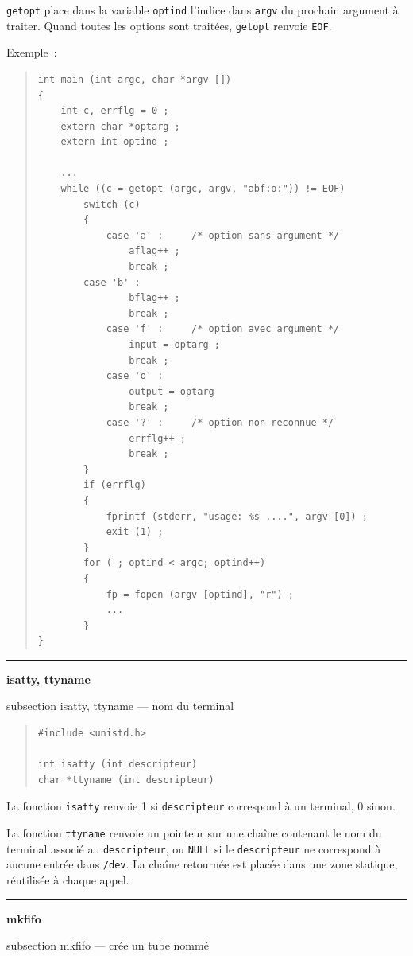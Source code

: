 \documentclass [twoside] {report}
\newcommand {\primitive} [1]
    {
	\phantomsection
	{\large \textbf {#1}}
	\addcontentsline {toc} {subsection} {#1}
    }
\newcommand {\separation}
    {
	\vspace {5mm}
	\nopagebreak
	\hrule
    }
\begin{document}
\texttt {getopt} place dans la variable \texttt {optind} l'indice dans
\texttt {argv} du prochain argument à traiter. Quand toutes les
options sont traitées, \texttt {getopt} renvoie \texttt {EOF}.

Exemple~:

\begin {quote}
\begin {verbatim}
int main (int argc, char *argv [])
{
    int c, errflg = 0 ;
    extern char *optarg ;
    extern int optind ;

    ...
    while ((c = getopt (argc, argv, "abf:o:")) != EOF)
        switch (c)
        {
            case 'a' :     /* option sans argument */
                aflag++ ;
                break ;
	    case 'b' :
                bflag++ ;
                break ;
            case 'f' :     /* option avec argument */
                input = optarg ;
                break ;
            case 'o' :
                output = optarg
                break ;
            case '?' :     /* option non reconnue */
                errflg++ ;
                break ;
        }
        if (errflg)
        {
            fprintf (stderr, "usage: %
            exit (1) ;
        }
        for ( ; optind < argc; optind++)
        {
            fp = fopen (argv [optind], "r") ;
            ...
        }
}
\end{verbatim}
\end {quote}


\separation 
\primitive {isatty, ttyname} --- nom du terminal

\begin {quote}
\begin {verbatim}
#include <unistd.h>

int isatty (int descripteur)
char *ttyname (int descripteur)
\end{verbatim}
\end {quote}

La fonction \texttt {isatty} renvoie 1 si \texttt {descripteur} correspond
à un terminal, 0 sinon.

La fonction \texttt {ttyname} renvoie un pointeur sur une chaîne contenant
le nom du terminal associé au \texttt {descripteur}, ou \texttt {NULL} si le
\texttt {descripteur} ne correspond à aucune entrée dans \texttt {/dev}. La
chaîne retournée est placée dans une zone statique, réutilisée à chaque
appel.



\separation
\primitive {mkfifo} --- crée un tube nommé
    \label {mkfifo}
\end{document}
